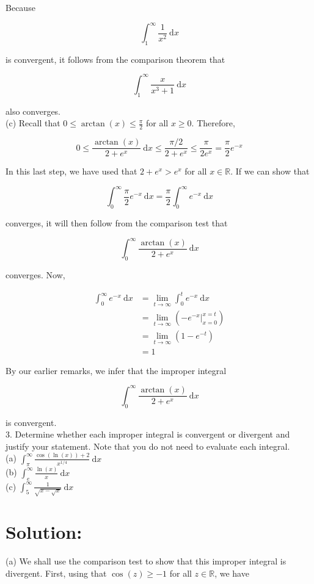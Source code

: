 \documentclass[10pt]{article}
\begin{document}
Because

$$
\int_{1}^{\infty} \frac{1}{x^{2}} \mathrm{~d} x
$$

is convergent, it follows from the comparison theorem that

$$
\int_{1}^{\infty} \frac{x}{x^{3}+1} \mathrm{~d} x
$$

also converges.\\
(c) Recall that $0 \leq \arctan (x) \leq \frac{\pi}{2}$ for all $x \geq 0$. Therefore,

$$
0 \leq \frac{\arctan (x)}{2+e^{x}} \mathrm{~d} x \leq \frac{\pi / 2}{2+e^{x}} \leq \frac{\pi}{2 e^{x}}=\frac{\pi}{2} e^{-x}
$$

In this last step, we have used that $2+e^{x}>e^{x}$ for all $x \in \mathbb{R}$. If we can show that

$$
\int_{0}^{\infty} \frac{\pi}{2} e^{-x} \mathrm{~d} x=\frac{\pi}{2} \int_{0}^{\infty} e^{-x} \mathrm{~d} x
$$

converges, it will then follow from the comparison test that

$$
\int_{0}^{\infty} \frac{\arctan (x)}{2+e^{x}} \mathrm{~d} x
$$

converges. Now,

$$
\begin{aligned}
\int_{0}^{\infty} e^{-x} \mathrm{~d} x & =\lim _{t \rightarrow \infty} \int_{0}^{t} e^{-x} \mathrm{~d} x \\
& =\lim _{t \rightarrow \infty}\left(-\left.e^{-x}\right|_{x=0} ^{x=t}\right) \\
& =\lim _{t \rightarrow \infty}\left(1-e^{-t}\right) \\
& =1
\end{aligned}
$$

By our earlier remarks, we infer that the improper integral

$$
\int_{0}^{\infty} \frac{\arctan (x)}{2+e^{x}} \mathrm{~d} x
$$

is convergent.\\
3. Determine whether each improper integral is convergent or divergent and justify your statement. Note that you do not need to evaluate each integral.\\
(a) $\int_{\pi}^{\infty} \frac{\cos (\ln (x))+2}{x^{1 / 4}} \mathrm{~d} x$\\
(b) $\int_{e}^{\infty} \frac{\ln (x)}{x} \mathrm{~d} x$\\
(c) $\int_{5}^{\infty} \frac{1}{\sqrt{x-\sqrt{x}}} \mathrm{~d} x$

\section*{Solution:}
(a) We shall use the comparison test to show that this improper integral is divergent. First, using that $\cos (z) \geq-1$ for all $z \in \mathbb{R}$, we have
\end{document}
